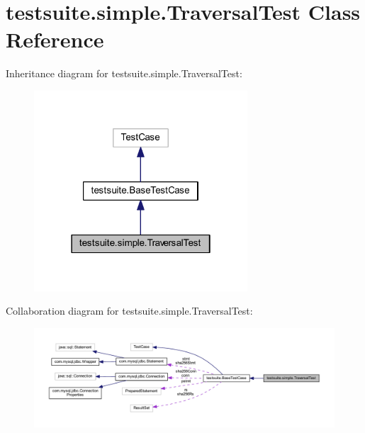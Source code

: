\hypertarget{classtestsuite_1_1simple_1_1_traversal_test}{}\section{testsuite.\+simple.\+Traversal\+Test Class Reference}
\label{classtestsuite_1_1simple_1_1_traversal_test}


Inheritance diagram for testsuite.\+simple.\+Traversal\+Test\+:
\nopagebreak
\begin{figure}[H]
\begin{center}
\leavevmode
\includegraphics[width=226pt]{classtestsuite_1_1simple_1_1_traversal_test__inherit__graph}
\end{center}
\end{figure}


Collaboration diagram for testsuite.\+simple.\+Traversal\+Test\+:
\nopagebreak
\begin{figure}[H]
\begin{center}
\leavevmode
\includegraphics[width=350pt]{classtestsuite_1_1simple_1_1_traversal_test__coll__graph}
\end{center}
\end{figure}
